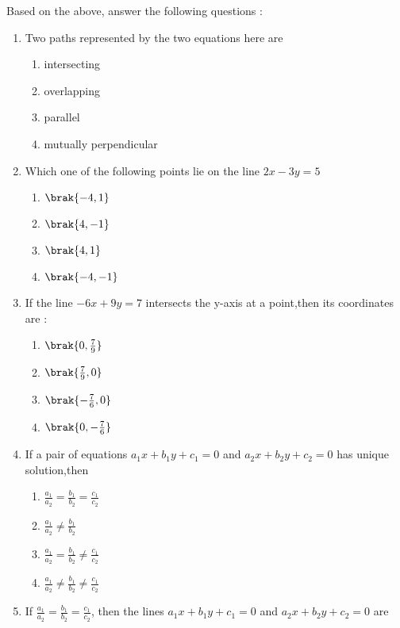 \begin{enumerate}
Based on the above, answer the following questions :
 \begin{enumerate}[label=(\roman*)]
 \item Two paths represented by the two equations here are 
  \begin{enumerate}[label=(\Alph*)]
             \item intersecting
             \item overlapping
             \item parallel
             \item mutually perpendicular
    \end{enumerate}
\item Which one of the following points lie on the line $2x-3y=5$
\begin{enumerate}[label=(\Alph*)]
             \item $\brak{ -4,1 }$
             \item $\brak{ 4,-1 }$
             \item $\brak{ 4,1 }$
             \item $\brak{ -4,-1 }$
    \end{enumerate}
\item If the line $-6x+9y=7$ intersects the y-axis at a point,then its coordinates are :
\begin{enumerate}[label=(\Alph*)]
             \item $\brak{0,\frac{7}{9}}$
             \item $\brak{\frac{7}{9},0}$
             \item $\brak{-\frac{7}{6},0}$
             \item $\brak{0,-\frac{7}{6}}$
\end{enumerate}
\item If a pair of equations $a_1x+b_1y+c_1=0$ and  $a_2x+b_2y+c_2=0$ has unique solution,then
\begin{enumerate}[label=(\Alph*)]
             \item $\frac{a_1}{a_2}=\frac{b_1}{b_2}=\frac{c_1}{c_2}$
             \item  $\frac{a_1}{a_2}\neq\frac{b_1}{b_2}$
             \item $\frac{a_1}{a_2}=\frac{b_1}{b_2}\neq\frac{c_1}{c_2}$
             \item $\frac{a_1}{a_2}\neq\frac{b_1}{b_2}\neq\frac{c_1}{c_2}$
\end{enumerate}
\item If $\frac{a_1}{a_2}=\frac{b_1}{b_2}=\frac{c_1}{c_2}$, then the lines $a_1x+b_1y+c_1=0$ and  $a_2x+b_2y+c_2=0$ are

\end{enumerate}
\end{enumerate}
